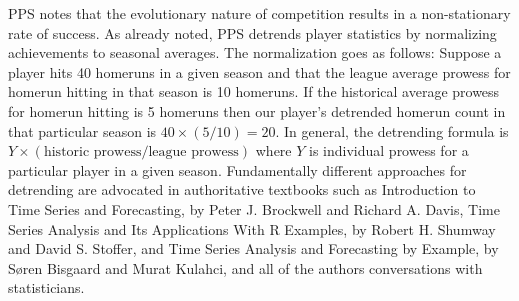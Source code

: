 \documentclass[11pt]{article}\usepackage[]{graphicx}\usepackage[]{color}
\begin{document}
PPS notes that the evolutionary nature of competition results in a 
non-stationary rate of success.  As already noted, PPS detrends player 
statistics by normalizing achievements to seasonal averages.  
The normalization goes as follows: 
	Suppose a player hits 40 homeruns in a given season and that the league 
	average prowess for homerun hitting in that season is 10 homeruns. If the 
	historical average prowess for homerun hitting is 5 homeruns then our 
	player's detrended homerun count in that particular season is 
	$40\times(5/10) = 20$.  In general, the detrending formula is 
	$Y \times (\text{historic prowess} / \text{league prowess})$ where $Y$ is 
  individual prowess for a particular player in a given season.
Fundamentally different approaches for detrending are advocated in 
authoritative textbooks such as 
	Introduction to Time Series and Forecasting,
		by
	Peter J. Brockwell and Richard A. Davis,
	Time Series Analysis and Its Applications With R Examples, 
	  by 
	  Robert H. Shumway and David S. Stoffer, 
	and
	Time Series Analysis and Forecasting by Example, 
	  by
	  S{\o}ren Bisgaard and Murat Kulahci,
and all of the authors conversations with statisticians.  

\end{document}
